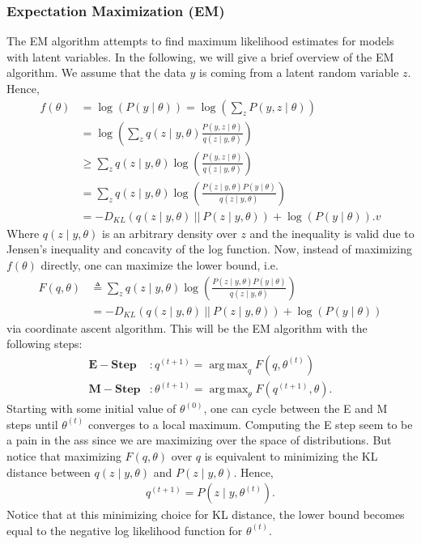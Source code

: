 \documentclass[10pt ]{article}
\DeclareMathOperator*{\argmaxA}{arg\,max}
\begin{document}
\subsubsection{Expectation Maximization (EM)}
The EM algorithm attempts to find maximum likelihood estimates for models with latent variables. In the following, we will give a brief overview of the EM algorithm. We assume that the data $y$ is coming from a latent random variable $z$. Hence,
\begin{align}
f(\theta) &= \log \left( P(y \mid \theta) \right) = \log \left( \sum_z P(y,z \mid \theta)\right) \nonumber \\
&= \log \left( \sum_z q(z \mid y, \theta) \frac{P(y,z \mid \theta)}{q(z \mid y, \theta)}\right) \nonumber \\
&\ge \sum_z q(z \mid y, \theta) \log \left( \frac{P(y,z \mid \theta)}{q(z \mid y, \theta)} \right) \nonumber \\
&= \sum_z q(z \mid y, \theta) \log \left( \frac{P(z \mid y, \theta) P(y \mid \theta)}{q(z \mid y, \theta)} \right) \nonumber \\
&= - D_{KL}\left( q(z \mid y, \theta) ~ ||~ P(z \mid y, \theta) \right) + \log \left( P(y \mid \theta) \right).v 
\end{align}
Where $ q(z \mid y, \theta) $ is an arbitrary density over $z$ and the inequality is valid due to Jensen's inequality and concavity of the log function. Now, instead of maximizing $f(\theta)$ directly, one can maximize the lower bound, i.e.
\begin{align}
F(q, \theta) &\triangleq \sum_z q(z \mid y, \theta) \log \left( \frac{P(z \mid y, \theta) P(y \mid \theta)}{q(z \mid y, \theta)} \right) \nonumber \\
&= - D_{KL}\left( q(z \mid y, \theta) ~ ||~ P(z \mid y, \theta) \right) + \log \left( P(y \mid \theta) \right)
\end{align}
via coordinate ascent algorithm. This will be the EM algorithm with the following steps:
\begin{align}
\mathbf{E-Step} &: q^{(t+1)} = \argmaxA_{q} F(q, \theta^{(t)}) \\
\mathbf{M-Step} &: \theta^{(t+1)} = \argmaxA_{\theta} F(q^{(t+1)}, \theta).
\end{align}
Starting with some initial value of $\theta^{(0)}$, one can cycle between the E and M steps until $\theta^{(t)}$ converges to a local maximum. Computing the E step seem to be a pain in the ass since we are maximizing over the space of distributions. But notice that maximizing $F(q, \theta)$ over $q$ is equivalent to minimizing the KL distance between $q(z \mid y, \theta)$  and $P(z \mid y, \theta) $. Hence, 
\begin{align}
q^{(t+1)} = P(z \mid y, \theta^{(t)}).
\label{eq_q_t_1}
\end{align}
Notice that at this minimizing choice for KL distance, the lower bound becomes equal to the negative log likelihood function for $\theta^{(t)}$. 
\end{document}
